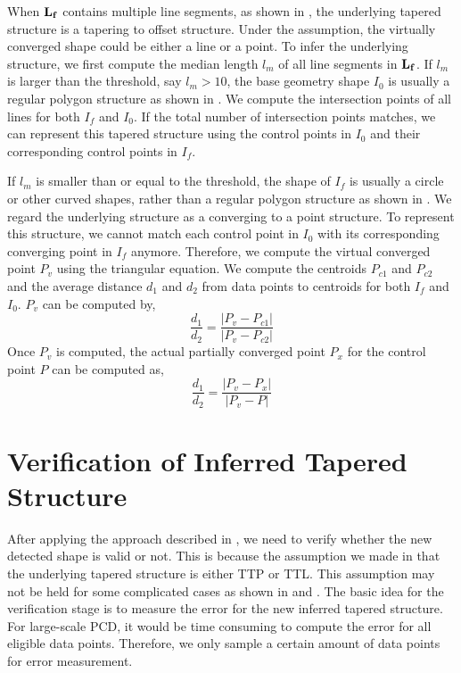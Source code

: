 When ${\bf L_f}$ contains multiple line segments,
as shown in ,
the underlying tapered structure is a tapering to offset structure.
Under the assumption, the virtually converged shape
could be either a line or a point.
To infer the underlying structure,
we first compute the median length $l_m$ of all line segments in ${\bf L_f}$.
If $l_m$ is larger than the threshold, say $l_m > 10$,
the base geometry shape $I_0$ is usually a regular polygon structure
as shown in .
We compute the intersection points of all lines for both $I_f$ and $I_0$.
If the total number of intersection points matches,
we can represent this tapered structure using the control points
in $I_0$ and their corresponding control points in $I_f$.

If $l_m$ is smaller than or equal to the threshold,
the shape of $I_f$ is usually a circle or other curved shapes,
rather than a regular polygon structure as shown in .
We regard the underlying structure as a converging to a point structure.
To represent this structure,
we cannot match each control point in $I_0$ with its corresponding
converging point in $I_f$ anymore.
Therefore, we compute the virtual converged point $P_v$
using the triangular equation.
We compute the centroids $P_{c1}$ and $P_{c2}$
and the average distance $d_1$ and $d_2$ from data points to centroids
for both $I_f$ and $I_0$.
$P_v$ can be computed by,
\begin{equation*}
\frac{d_1}{d_2} = \frac{|P_v - P_{c1}|}{|P_v - P_{c2}|}
\end{equation*}
Once $P_v$ is computed, the actual partially converged point $P_x$
for the control point $P$ can be computed as,
\begin{equation*}
\frac{d_1}{d_2} = \frac{|P_v - P_x|}{|P_v - P|}
\end{equation*}

\section{Verification of Inferred Tapered Structure}
\label{sec:vts}


After applying the approach described in , we need to verify
whether the new detected shape is valid or not.
This is because the assumption we made in  that
the underlying tapered structure is either TTP or TTL.
This assumption may not be held for some complicated cases
as shown in  and .
The basic idea for the verification stage is to measure the error
for the new inferred tapered structure.
For large-scale PCD, it would be time consuming to compute
the error for all eligible data points.
Therefore, we only sample a certain amount of data points for
error measurement.

